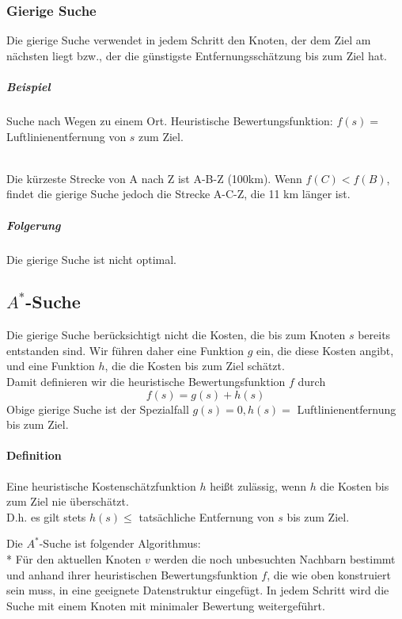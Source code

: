 \documentclass[a4paper]{scrartcl}
\begin{document}
\subsubsection{Gierige Suche}
Die gierige Suche verwendet in jedem Schritt den Knoten, der dem Ziel am nächsten liegt bzw., der die günstigste Entfernungsschätzung bis zum Ziel hat.
\subparagraph{Beispiel} Suche nach Wegen zu einem Ort.
Heuristische Bewertungsfunktion: $f(s) =$ Luftlinienentfernung von $s$ zum Ziel.\\
\\
Die kürzeste Strecke von A nach Z ist A-B-Z (100km). Wenn $f(C) < f(B)$, findet die gierige Suche jedoch die Strecke A-C-Z, die 11 km länger ist. 
\subparagraph{Folgerung} Die gierige Suche ist nicht optimal.

\subsection{$A^*$-Suche}
Die gierige Suche berücksichtigt nicht die Kosten, die bis zum Knoten $s$ bereits entstanden sind. Wir führen daher eine Funktion $g$ ein, die diese Kosten angibt, und eine Funktion $h$, die die Kosten bis zum Ziel schätzt.\\
Damit definieren wir die heuristische Bewertungsfunktion $f$ durch \[f(s) = g(s) + h(s)\]
Obige gierige Suche ist der Spezialfall $g(s) = 0, h(s) =$ Luftlinienentfernung bis zum Ziel.

\paragraph{Definition} Eine heuristische Kostenschätzfunktion $h$ heißt zulässig, wenn $h$ die Kosten bis zum Ziel nie überschätzt.\\
D.h. es gilt stets $h(s) \leq$ tatsächliche Entfernung von $s$ bis zum Ziel.

Die $A^*$-Suche ist folgender Algorithmus:\\*
Für den aktuellen Knoten $v$ werden die noch unbesuchten Nachbarn bestimmt und anhand ihrer heuristischen Bewertungsfunktion $f$, die wie oben konstruiert sein muss, in eine geeignete Datenstruktur eingefügt. In jedem Schritt wird die Suche mit einem Knoten mit minimaler Bewertung weitergeführt.
\end{document}
